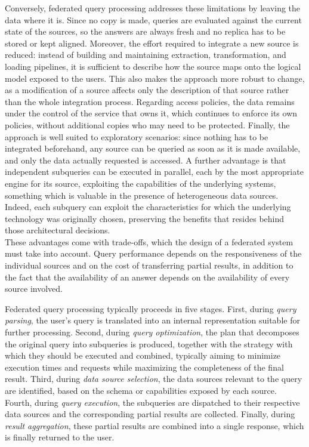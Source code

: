 Conversely, federated query processing addresses these limitations by leaving
the data where it is. Since no copy is made, queries are evaluated against the
current state of the sources, so the answers are always fresh and no replica has
to be stored or kept aligned. Moreover, the effort required to integrate a new
source is reduced: instead of building and maintaining extraction,
transformation, and loading pipelines, it is sufficient to describe how the
source maps onto the logical model exposed to the users. This also makes the
approach more robust to change, as a modification of a source affects only the
description of that source rather than the whole integration process. Regarding
access policies, the data remains under the control of the service that owns it,
which continues to enforce its own policies, without additional copies who may
need to be protected. Finally, the approach is well suited to exploratory
scenarios: since nothing has to be integrated beforehand, any source can be
queried as soon as it is made available, and only the data actually requested is
accessed. A further advantage is that independent subqueries can be executed in
parallel, each by the most appropriate engine for its source, exploiting the
capabilities of the underlying systems, something which is valuable in the
presence of heterogeneous data sources. Indeed, each subquery can exploit the
characteristics for which the underlying technology was originally chosen,
preserving the benefits that resides behind those architectural decisions. \\
These advantages come with trade-offs, which the design of a federated system
must take into account. Query performance depends on the responsiveness of the
individual sources and on the cost of transferring partial results, in addition
to the fact that the availability of an answer depends on the availability of
every source involved.

Federated query processing typically proceeds in five stages. First, during
\textit{query parsing}, the user's query is translated into an internal
representation suitable for further processing. Second, during
\textit{query optimization}, the plan that decomposes the original query into
subqueries is produced, together with the strategy with which they
should be executed and combined, typically aiming to minimize execution times
and requests while maximizing the completeness of the final result. Third, during
\textit{data source selection}, the data sources relevant to the query are
identified, based on the schema or capabilities exposed by each source.
Fourth, during \textit{query execution}, the subqueries are dispatched to
their respective data sources and the corresponding partial results are
collected. Finally, during \textit{result aggregation}, these partial results
are combined into a single response, which is finally returned to the user.

